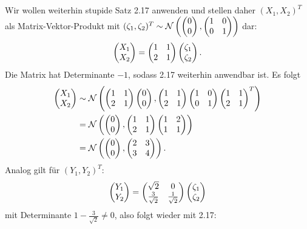 \documentclass[a4paper]{article}
\begin{document}
\subsection{}


\subsection{}

Wir wollen weiterhin stupide Satz 2.17 anwenden und stellen daher $(X_1, X_2)^T$ als Matrix-Vektor-Produkt mit $(\zeta_1, \zeta_2)^T \sim \mathcal{N}\left(\left(\begin{matrix}0 \\ 0\end{matrix}\right), \left(\begin{matrix}1 & 0 \\ 0 & 1\end{matrix}\right)\right)$ dar:
\begin{equation*}
    \left(\begin{matrix}X_1 \\ X_2\end{matrix}\right) = \left(\begin{matrix}1 & 1 \\ 2 & 1\end{matrix}\right) \left(\begin{matrix}\zeta_1\\ \zeta_2\end{matrix}\right)\text{.}
\end{equation*}
Die Matrix hat Determinante $-1$, sodass 2.17 weiterhin anwendbar ist. Es folgt
\begin{align*}
    \left(\begin{matrix}X_1 \\ X_2\end{matrix}\right) &\sim \mathcal{N} \left( \left(\begin{matrix}1 & 1 \\ 2 & 1\end{matrix}\right) \left(\begin{matrix}0 \\ 0\end{matrix}\right), \left(\begin{matrix}1 & 1 \\ 2 & 1\end{matrix}\right) \left(\begin{matrix}1 & 0 \\ 0 & 1\end{matrix}\right) \left(\begin{matrix}1 & 1 \\ 2 & 1\end{matrix}\right)^T \right)\\
    &= \mathcal{N} \left( \left(\begin{matrix}0 \\ 0\end{matrix}\right), \left(\begin{matrix}1 & 1 \\ 2 & 1\end{matrix}\right) \left(\begin{matrix}1 & 2 \\ 1 & 1\end{matrix}\right) \right)\\
    &= \mathcal{N} \left( \left(\begin{matrix}0 \\ 0\end{matrix}\right), \left(\begin{matrix}2 & 3 \\ 3 & 4\end{matrix}\right) \right)\text{.}
\end{align*}
Analog gilt für $(Y_1, Y_2)^T$:
\begin{equation*}
    \left(\begin{matrix}Y_1 \\ Y_2\end{matrix}\right) = \left(\begin{matrix}\sqrt{2} & 0 \\ \frac{3}{\sqrt{2}} & \frac{1}{\sqrt{2}}\end{matrix}\right) \left(\begin{matrix}\zeta_1 \\ \zeta_2\end{matrix}\right)
\end{equation*}
mit Determinante $1 - \frac{3}{\sqrt{2}} \neq 0$, also folgt wieder mit 2.17:
\end{document}
